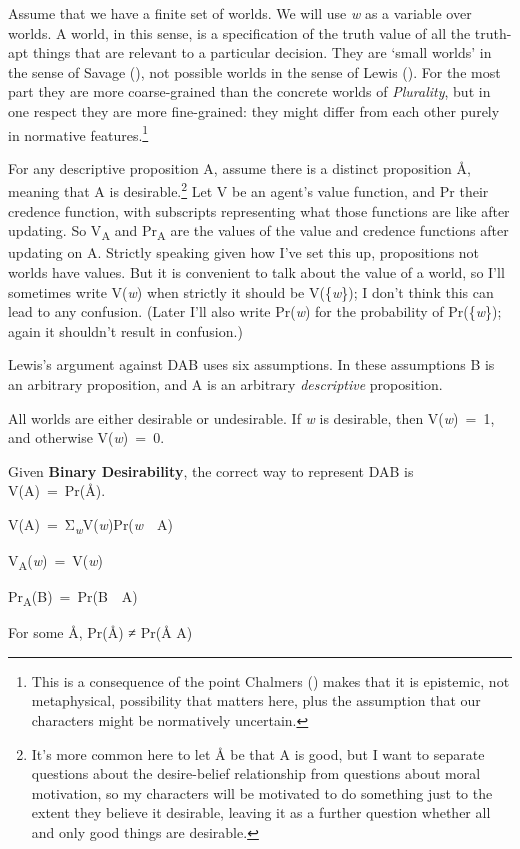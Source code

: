 \documentclass[
  11pt,
  letterpaper,
  DIV=11,
  numbers=noendperiod,
  twoside]{scrartcl}
\providecommand{\tightlist}{%
  \setlength{\itemsep}{0pt}\setlength{\parskip}{0pt}}
\begin{document}
Assume that we have a finite set of worlds. We will use \emph{w} as a
variable over worlds. A world, in this sense, is a specification of the
truth value of all the truth-apt things that are relevant to a
particular decision. They are `small worlds' in the sense of Savage
(), not possible worlds in the sense of
Lewis (). For the most part they are more
coarse-grained than the concrete worlds of \emph{Plurality}, but in one
respect they are more fine-grained: they might differ from each other
purely in normative features.\footnote{This is a consequence of the
  point Chalmers () makes that it is
  epistemic, not metaphysical, possibility that matters here, plus the
  assumption that our characters might be normatively uncertain.}

For any descriptive proposition A, assume there is a distinct
proposition Å, meaning that A is desirable.\footnote{It's more common
  here to let Å be that A is good, but I want to separate questions
  about the desire-belief relationship from questions about moral
  motivation, so my characters will be motivated to do something just to
  the extent they believe it desirable, leaving it as a further question
  whether all and only good things are desirable.} Let V be an agent's
value function, and Pr their credence function, with subscripts
representing what those functions are like after updating. So
V\textsubscript{A} and Pr\textsubscript{A} are the values of the value
and credence functions after updating on A. Strictly speaking given how
I've set this up, propositions not worlds have values. But it is
convenient to talk about the value of a world, so I'll sometimes write
V(\emph{w}) when strictly it should be V(\{\emph{w}\}); I don't think
this can lead to any confusion. (Later I'll also write Pr(\emph{w}) for
the probability of Pr(\{\emph{w}\}); again it shouldn't result in
confusion.)

Lewis's argument against DAB uses six assumptions. In these assumptions
B is an arbitrary proposition, and A is an arbitrary \emph{descriptive}
proposition.

\begin{description}
\tightlist
\item[Binary Desirability]
All worlds are either desirable or undesirable. If \emph{w} is
desirable, then V(\emph{w})~=~1, and otherwise V(\emph{w})~=~0.
\item[Equation]
Given \textbf{Binary Desirability}, the correct way to represent DAB is
V(A)~=~Pr(Å).
\item[Additivity]
V(A)~=~Σ\textsubscript{\emph{w}}V(\emph{w})Pr(\emph{w}~\textbar~A)
\item[Worldly Invariance]
V\textsubscript{A}(\emph{w})~=~V(\emph{w})
\item[Restricted Conditionalisation]
Pr\textsubscript{A}(B)~=~Pr(B~\textbar~A)
\item[Possible Dependence]
For some Å, Pr(Å) ≠ Pr(Å \textbar{} A)
\end{description}
\end{document}
